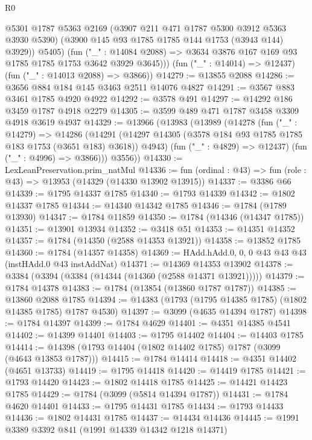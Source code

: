 \begin{lexlean}{R0}
\begin{coremodule}
              @5301
              @1787
              @5363
              @2169
              (@3907 @211 @471 @1787 @5300 @3912 @5363 @3930 @5390)
              (@3900 @145 @93 @1785 @1785 @144 @1753 (@3943 @144) @3929))
            @5405)
          (fun ("_" : @14084 @2088) =>
          @3634 @3876 @167 @169 @93 @1785 @1785 @1753 @3642 @3929 @3645)))
      (fun ("_" : @14014) => @12437)
      (fun ("_" : @14013 @2088) => @3866))
@14279 := @13855 @2088
@14286 := @3656 @884 @184 @145 @3463 @2511 @14076 @4827
@14291 := @3567 @883 @3461 @1785 @4920 @4922
@14292 := @3578 @491
@14297 := @14292 @186 @3459 @1787 @4918 @2279
@14305 := @3599 @489 @471 @1787 @3458 @3309 @4918 @3619 @4937
@14329 := @13966
    (@13983
      (@13989
        (@14278
          (fun ("_" : @14279) =>
          @14286
            (@14291
              (@14297 @14305 (@3578 @184 @93 @1785 @1785 @183 @1753 (@3651 @183) @3618))
              @4943)
            (fun ("_" : @4829) => @12437)
            (fun ("_" : @4996) => @3866)))
        @3556))
@14330 := LexLeanPreservation.prim_natMul
@14336 := fun (ordinal : @43) => fun (role : @43) => @13953 (@14329 (@14330 @13902 @13915))
@14337 := @3386 @66
@14339 := @1795 @14337 @1785
@14340 := @1793 @14339
@14342 := @1802 @14337 @1785
@14344 := @14340 @14342 @1785
@14346 := @1784 (@1789 @13930)
@14347 := @1784 @11859
@14350 := @1784 (@14346 (@14347 @1785))
@14351 := @13901 @13934
@14352 := @3418 @51
@14353 := @14351 @14352
@14357 := @1784 (@14350 (@2588 @14353 @13921))
@14358 := @13852 @1785
@14360 := @1784 (@14357 @14358)
@14369 := HAdd.hAdd.{0, 0, 0} @43 @43 @43 (instHAdd.{0} @43 instAddNat)
@14371 := @14369 @14353 @13902
@14378 := @3384 (@3394 (@3384 (@14344 (@14360 (@2588 @14371 @13921)))))
@14379 := @1784 @14378
@14383 := @1784 (@13854 (@13860 @1787 @1787))
@14385 := @13860 @2088 @1785
@14394 := @14383 (@1793 (@1795 @14385 @1785) (@1802 @14385 @1785) @1787 @4530)
@14397 := @3099 (@4635 @14394 @1787)
@14398 := @1784 @14397
@14399 := @1784 @4629
@14401 := @4351 @14385 @4541
@14402 := @14399 @14401
@14403 := @1795 @14402
@14404 := @14403 @1785
@14414 := @14398 (@1793 @14404 (@1802 @14402 @1785) @1787 (@3099 (@4643 @13853 @1787)))
@14415 := @1784 @14414
@14418 := @4351 @14402 (@4651 @13733)
@14419 := @1795 @14418
@14420 := @14419 @1785
@14421 := @1793 @14420
@14423 := @1802 @14418 @1785
@14425 := @14421 @14423 @1785
@14429 := @1784 (@3099 (@5814 @14394 @1787))
@14431 := @1784 @4620 @14401
@14433 := @1795 @14431 @1785
@14434 := @1793 @14433
@14436 := @1802 @14431 @1785
@14437 := @14434 @14436
@14445 := @1991 @3389 @3392 @841 (@1991 @14339 @14342 @1218 @14371)

\end{coremodule}
\end{lexlean}
